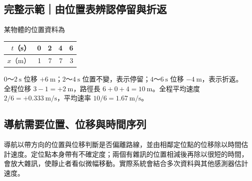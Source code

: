 \documentclass[11pt,a4paper]{article}
\newcounter{none}
\begin{document}
\begin{HandoutWorkedExample}

\subsection{完整示範｜由位置表辨認停留與折返}\label{ux5b8cux6574ux793aux7bc4ux7531ux4f4dux7f6eux8868ux8fa8ux8a8dux505cux7559ux8207ux6298ux8fd4}

某物體的位置資料為

{\def\LTcaptype{none} %
\begin{longtable}[]{@{}rrrrr@{}}
\toprule\noalign{}
\(t\)（s） & 0 & 2 & 4 & 6 \\
\midrule\noalign{}
\endhead
\bottomrule\noalign{}
\endlastfoot
\(x\)（m） & 1 & 7 & 7 & 3 \\
\end{longtable}
}

\(0\)～\(2\ \mathrm s\) 位移 \(+6\ \mathrm m\)；\(2\)～\(4\ \mathrm s\) 位置不變，表示停留；\(4\)～\(6\ \mathrm s\) 位移 \(-4\ \mathrm m\)，表示折返。全程位移 \(3-1=+2\ \mathrm m\)，路徑長 \(6+0+4=10\ \mathrm m\)。全程平均速度 \(2/6=+0.333\ \mathrm{m/s}\)，平均速率 \(10/6=1.67\ \mathrm{m/s}\)。

\end{HandoutWorkedExample}

\subsection{導航需要位置、位移與時間序列}\label{ux5c0eux822aux9700ux8981ux4f4dux7f6eux4f4dux79fbux8207ux6642ux9593ux5e8fux5217}

導航以帶方向的位置與位移判斷是否偏離路線，並由相鄰定位點的位移除以時間估計速度。定位點本身帶有不確定度；兩個有雜訊的位置相減後再除以很短的時間，會放大雜訊，使靜止者看似微幅移動。實際系統會結合多次資料與其他感測器估計速度。
\end{document}
